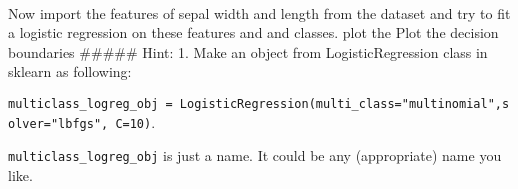 \documentclass[11pt]{article}
\begin{document}
    \begin{center}
    \end{center}
    { \hspace*{\fill} \\}
    
    Now import the features of sepal width and length from the dataset and
try to fit a logistic regression on these features and and classes. plot
the Plot the decision boundaries \#\#\#\#\# Hint: 1. Make an object from
LogisticRegression class in sklearn as following:

\texttt{multiclass\_logreg\_obj\ =\ LogisticRegression(multi\_class="multinomial",solver="lbfgs",\ C=10)}.

\texttt{multiclass\_logreg\_obj} is just a name. It could be any
(appropriate) name you like.
\end{document}
